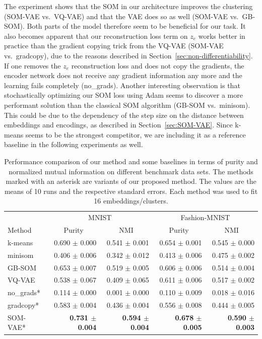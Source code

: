 The experiment shows that the SOM in our architecture improves the clustering (SOM-VAE vs.\ VQ-VAE) and that the VAE does so as well (SOM-VAE vs.\ GB-SOM).
Both parts of the model therefore seem to be beneficial for our task.
It also becomes apparent that our reconstruction loss term on $z_e$ works better in practice than the gradient copying trick from the VQ-VAE (SOM-VAE vs.\ gradcopy), due to the reasons described in Section~\ref{sec:non-differentiability}.
If one removes the $z_e$ reconstruction loss and does not copy the gradients, the encoder network does not receive any gradient information any more and the learning fails completely (no\_grads).
Another interesting observation is that stochastically optimizing our SOM loss using Adam \citep{Kingma2015} seems to discover a more performant solution than the classical SOM algorithm (GB-SOM vs.\ minisom).
This could be due to the dependency of the step size on the distance between embeddings and encodings, as described in Section~\ref{sec:SOM-VAE}.
Since k-means seems to be the strongest competitor, we are including it as a reference baseline in the following experiments as well.


\begin{table}
    \centering
    \caption{Performance comparison of our method and some baselines in terms of purity and normalized mutual information on different benchmark data sets. The methods marked with an asterisk are variants of our proposed method. The values are the means of 10 runs and the respective standard errors. Each method was used to fit 16 embeddings/clusters.}
    \begin{tabular}{lrrrr}
        \toprule
         & \multicolumn{2}{c}{MNIST} & \multicolumn{2}{c}{Fashion-MNIST} \\
        \cmidrule(rl){2-3}
        \cmidrule(rl){4-5}
        Method & \multicolumn{1}{c}{Purity} & \multicolumn{1}{c}{NMI} & \multicolumn{1}{c}{Purity} & \multicolumn{1}{c}{NMI} \\
         \midrule
         k-means & 0.690 $\pm$ 0.000 & 0.541 $\pm$ 0.001 & 0.654 $\pm$ 0.001 & 0.545 $\pm$ 0.000 \\
         minisom & 0.406 $\pm$ 0.006 & 0.342 $\pm$ 0.012 & 0.413 $\pm$ 0.006 & 0.475 $\pm$ 0.002 \\
         GB-SOM & 0.653 $\pm$ 0.007 & 0.519 $\pm$ 0.005 & 0.606 $\pm$ 0.006 & 0.514 $\pm$ 0.004 \\
         VQ-VAE & 0.538 $\pm$ 0.067 & 0.409 $\pm$ 0.065 & 0.611 $\pm$ 0.006 & 0.517 $\pm$ 0.002 \\
         no\_grads* & 0.114 $\pm$ 0.000 & 0.001 $\pm$ 0.000 & 0.110 $\pm$ 0.009 & 0.018 $\pm$ 0.016 \\
         gradcopy* & 0.583 $\pm$ 0.004 & 0.436 $\pm$ 0.004 & 0.556 $\pm$ 0.008 & 0.444 $\pm$ 0.005 \\
         SOM-VAE* & \textbf{0.731 $\pm$ 0.004} & \textbf{0.594 $\pm$ 0.004} & \textbf{0.678 $\pm$ 0.005} & \textbf{0.590 $\pm$ 0.003} \\
         \bottomrule
    \end{tabular}
    \label{tab:performance}
\end{table}

